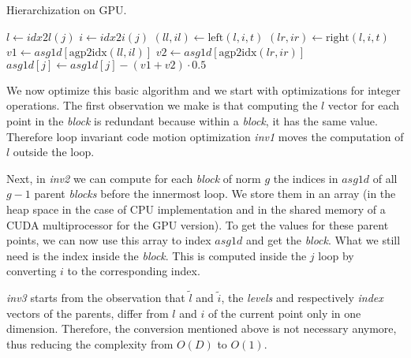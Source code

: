 \begin{algorithm}[h]
\small{
	\caption{Hierarchization on GPU.}
 	\label{alg:hierarchization}                       

 	\begin{algorithmic}[1]
 				\State {}
 			\EndFor
 		\EndFor
	\end{algorithmic}
 
	\begin{algorithmic}[1]
	 				\State $l \leftarrow idx2l(j)$
	 			\EndIf
	 			\State $i \leftarrow idx2i(j)$
	 			\State $(\textit{ll}, \textit{il}) \leftarrow \text{left}(l, i, t)$
	 			\State $(\textit{lr}, \textit{ir}) \leftarrow \text{right}(l, i, t)$
	 			\State $\textit{v1} \leftarrow \textit{asg1d}[\text{agp2idx}(\textit{ll},
	 			\textit{il})]$ \State $\textit{v2} \leftarrow
	 			\textit{asg1d}[\text{agp2idx}(\textit{lr}, \textit{ir})]$ \State$\textit{asg1d}[j] \leftarrow \textit{asg1d}[j] - (\textit{v1} +\textit{v2}) \cdot 0.5$
			\EndFor
		\EndProcedure
	\end{algorithmic}
}
\end{algorithm}

We now optimize this basic algorithm and we start with optimizations for integer
operations. The first observation we make is that computing the $l$ vector for
each point in the \textit{block} is redundant because within a \textit{block},
it has the same value. Therefore loop invariant code motion optimization
\textit{inv1} moves the computation of $l$ outside the loop. 

Next, in \textit{inv2} we can compute for each \textit{block} of norm $g$ the
indices in $asg1d$ of all $g-1$ parent \textit{blocks} before the innermost
loop. We store them in an array (in the heap space in the case of CPU
implementation and in the shared memory of a CUDA multiprocessor for the GPU
version). To get the values for these parent points, we can now use this array
to index $asg1d$ and get the \textit{block}. What we still need is the index
inside the \textit{block}. This is computed inside the $j$ loop by converting
$i$ to the corresponding index.

\textit{inv3} starts from the observation that $\tilde{l}$ and $\tilde{i}$, the
\textit{levels} and respectively \textit{index} vectors of the parents, differ
from $l$ and $i$ of the current point only in one dimension. Therefore, the
conversion mentioned above is not necessary anymore, thus reducing the
complexity from $O(D)$ to $O(1)$.

